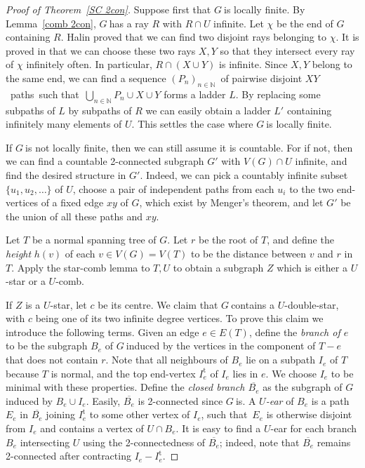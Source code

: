 \documentclass{article}
\newcommand{\defi}[1]{{\color{darkgray}\emph{#1}}}
\newcommand{\N}{\ensuremath{\mathbb N}}
\newcommand{\cls}[1]{\ensuremath{\overline{#1}}}
\newcommand{\nin}{\ensuremath{{n\in\N}}}
\newcommand{\pths}[2]{\ensuremath{#1}\text{--}\ensuremath{#2}~paths}
\newcommand{\seq}[1]{\ensuremath{(#1_n)_{n\in\N}}}
\newcommand{\g}{\ensuremath{G\ }}
\newcommand{\G}{\ensuremath{G}}
\newcommand{\Lr}[1]{Lemma~\ref{#1}}
\newcommand{\Tr}[1]{Theorem~\ref{#1}}
\newcommand{\lf}{locally finite}
\newcommand{\st}{such that}
\begin{document}
\begin{proof}[Proof of \Tr{SC 2con}]
Suppose first that \g is \lf. By \Lr{comb 2con}, \g has a ray $R$ with $R\cap U$ infinite. Let $\chi$ be the end of \g containing $R$. Halin \cite{halin74} proved that we can find two disjoint rays belonging to $\chi$.
 It is proved in \cite[Lemma~10]{fleisch} that we can choose these two rays $X,Y$ so that they intersect every ray of $\chi$ infinitely often. In particular, $R \cap (X\cup Y)$ is infinite. Since $X,Y$ belong to the same end, we can find a sequence \seq{P}\ of pairwise disjoint \pths{X}{Y}\ \st\ $\bigcup_\nin P_n \cup X\cup Y$ forms a ladder $L$. By replacing some subpaths of $L$ by subpaths of $R$ we can easily obtain a ladder $L'$ containing infinitely many elements of $U$. This settles the case where \g is \lf.
\medskip

If \g is not \lf, then we can still assume it is countable. For if not, then we can find a countable 2-connected subgraph $G'$ with $V(G) \cap U$ infinite, and find the desired structure in $G'$. Indeed, we can pick a countably infinite subset $\{u_1, u_2, \ldots \}$ of $U$, choose a pair of independent paths from each $u_i$ to the two end-vertices of a fixed edge $xy$ of \G, which exist by Menger's theorem, and let $G'$ be the union of all these paths and $xy$. 

Let $T$ be a normal spanning tree of \G. Let $r$ be the root of $T$, and define the \defi{height} $h(v)$ of each $v\in V(G)=V(T)$ to be the distance between $v$ and $r$ in $T$. Apply the star-comb lemma to $T,U$ to obtain a subgraph $Z$ which is either a $U$-star or a $U$-comb. 

If $Z$ is a $U$-star, let $c$ be its centre. We claim that \g contains a $U$-double-star, with $c$ being one of its two infinite degree vertices. To prove this claim we introduce the following terms. Given an edge $e\in E(T)$, define the \defi{branch of $e$} to be the subgraph $B_e$ of \g induced by the vertices in the component of $T - e$ that does not contain $r$. Note that all neighbours of $B_e$ lie on a subpath $I_e$ of $T$ because $T$ is normal, and the top end-vertex $I^\mathrm{t}_e$ of $I_e$ lies in $e$. We choose $I_e$ to be minimal with these properties. Define the \defi{closed branch $\cls{B_e}$} as the subgraph  of \g induced by $B_e \cup I_e$. Easily, $\cls{B_e}$ is 2-connected since \g is. A \defi{$U$-ear} of $B_e$ is a path $E_e$ in $\cls{B_e}$ joining $I^\mathrm{t}_e$ to some other vertex of $I_e$, \st\ $E_e$ is otherwise disjoint from $I_e$ and contains a vertex of $U\cap B_e$. It is easy to find a $U$-ear for each  branch $B_e$ intersecting $U$ using the 2-connectedness of $\cls{B_e}$; indeed, note that $\cls{B_e}$ remains 2-connected after contracting $I_e - I^\mathrm{t}_e$. 


\end{proof}
\end{document}
